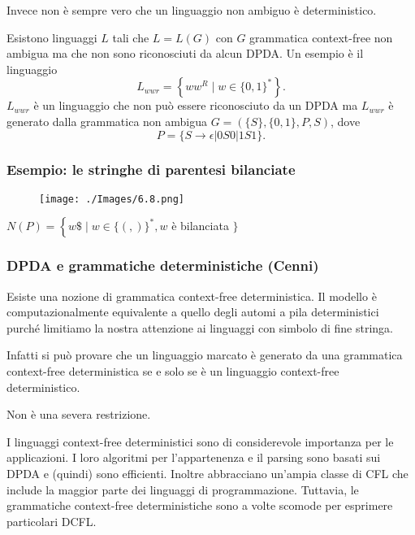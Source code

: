 \vspace{5mm}

Invece non è sempre vero che un linguaggio non ambiguo è deterministico.

Esistono linguaggi $L$ tali che $L=L(G)$ con $G$ grammatica context-free non ambigua ma che non sono riconosciuti da alcun DPDA.
Un esempio è il linguaggio
$$
L_{w w r}=\left\{w w^{R} \mid w \in\{0,1\}^{*}\right\} .
$$
$L_{w w r}$ è un linguaggio che non può essere riconosciuto da un DPDA ma $L_{w w r}$ è generato dalla grammatica non ambigua $G=(\{S\},\{0,1\}, P, S)$, dove
$$
P=\{S \rightarrow \epsilon|0 S 0| 1 S 1\} .
$$

\subsubsection{Esempio:
le stringhe di parentesi bilanciate}

\begin{figure}[hbpt!]
    \centering
    \texttt{[image: ./Images/6.8.png]}
\end{figure}
\FloatBarrier

$N(P)=\left\{w \$ \mid w \in\{(,)\}^{*}, w\right.$ è bilanciata $\}$

\subsubsection{DPDA e grammatiche deterministiche (Cenni)}

Esiste una nozione di grammatica context-free deterministica. Il modello è computazionalmente equivalente a quello degli automi a pila deterministici purché limitiamo la nostra attenzione ai linguaggi con simbolo di fine stringa.

Infatti si può provare che un linguaggio marcato è generato da una grammatica context-free deterministica se e solo se è un linguaggio context-free deterministico.

Non è una severa restrizione.

\vspace{5mm}

I linguaggi context-free deterministici sono di considerevole importanza per le applicazioni. I loro algoritmi per l'appartenenza e il parsing sono basati sui DPDA e (quindi) sono efficienti. Inoltre abbracciano un'ampia classe di CFL che include la maggior parte dei linguaggi di programmazione. Tuttavia, le grammatiche context-free deterministiche sono a volte scomode per esprimere particolari DCFL.

